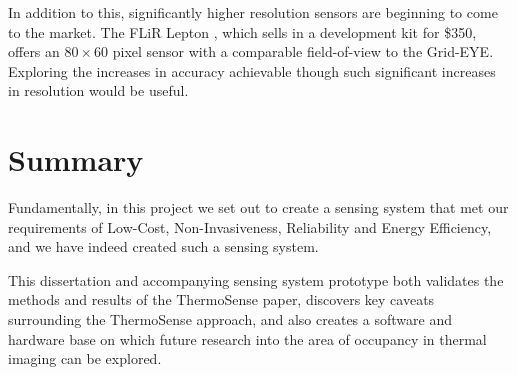 \documentclass[../thesis/thesis.tex]{subfiles}
\begin{document}
In addition to this, significantly higher resolution sensors are beginning to come to the market. The FLiR Lepton \cite{flir}, which sells in a development kit for \$350, offers an $80 \times 60$ pixel sensor with a comparable field-of-view to the Grid-EYE. Exploring the increases in accuracy achievable though such significant increases in resolution would be useful.

\section{Summary}
Fundamentally, in this project we set out to create a sensing system that met our requirements of Low-Cost, Non-Invasiveness, Reliability and Energy Efficiency, and we have indeed created such a sensing system. %

This dissertation and accompanying sensing system prototype both validates the methods and results of the ThermoSense paper, discovers key caveats surrounding the ThermoSense approach, and also creates a software and hardware base on which future research into the area of occupancy in thermal imaging can be explored.
 
\end{document}
